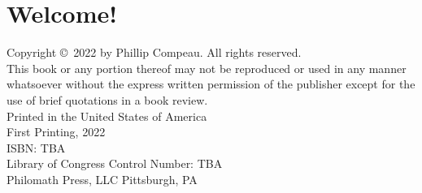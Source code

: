 \newpage
{}
\phantom{}
\thispagestyle{empty}
\addtocounter{page}{-1}
\newpage
{}
\phantom{}
\thispagestyle{empty}
\addtocounter{page}{-1}
\newpage
{}
\chapter*{Welcome!}


\phantom{}\vspace{7.7\baselineskip}

\noindent Copyright ©~2022 by Phillip Compeau. All rights reserved.\\

\noindent This book or any portion thereof may not be reproduced or used in any manner whatsoever without the express written permission of the publisher except for the use of brief quotations in a book review.\\

\noindent Printed in the United States of America\\

\noindent First Printing, 2022\\

\noindent ISBN: TBA\\

\noindent Library of Congress Control Number: TBA\\

\noindent Philomath Press, LLC
Pittsburgh, PA

%
%
%
%
%



\newpage



\tableofcontents*
\clearpage
{}


